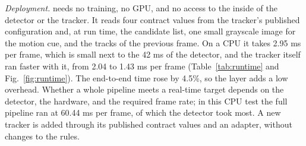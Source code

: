 \emph{Deployment.} \scl{} needs no training, no GPU, and no access to the inside of the detector or
the tracker. It reads four contract values from the tracker's published configuration and, at run
time, the candidate list, one small grayscale image for the motion cue, and the tracks of the
previous frame. On a CPU it takes 2.95 ms per frame, which is small next to the 42 ms of the
detector, and the tracker itself ran faster with it, from 2.04 to 1.43 ms per frame
(Table~\ref{tab:runtime} and Fig.~\ref{fig:runtime}). The end-to-end time rose by 4.5\%, so the
layer adds a low overhead. Whether a whole pipeline meets a real-time target depends on the
detector, the hardware, and the required frame rate; in this CPU test the full pipeline ran at
60.44 ms per frame, of which the detector took most. A new tracker is added through its published
contract values and an adapter, without changes to the rules.
